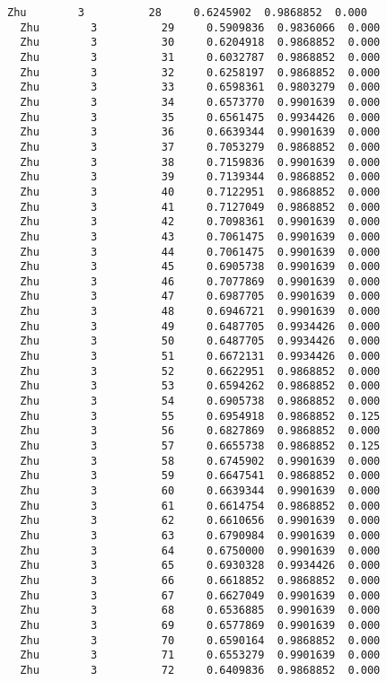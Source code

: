 \documentclass[11pt]{article}
\begin{document}
\begin{Verbatim}[commandchars=\\\{\}]
  Zhu        3          28     0.6245902  0.9868852  0.000
  Zhu        3          29     0.5909836  0.9836066  0.000
  Zhu        3          30     0.6204918  0.9868852  0.000
  Zhu        3          31     0.6032787  0.9868852  0.000
  Zhu        3          32     0.6258197  0.9868852  0.000
  Zhu        3          33     0.6598361  0.9803279  0.000
  Zhu        3          34     0.6573770  0.9901639  0.000
  Zhu        3          35     0.6561475  0.9934426  0.000
  Zhu        3          36     0.6639344  0.9901639  0.000
  Zhu        3          37     0.7053279  0.9868852  0.000
  Zhu        3          38     0.7159836  0.9901639  0.000
  Zhu        3          39     0.7139344  0.9868852  0.000
  Zhu        3          40     0.7122951  0.9868852  0.000
  Zhu        3          41     0.7127049  0.9868852  0.000
  Zhu        3          42     0.7098361  0.9901639  0.000
  Zhu        3          43     0.7061475  0.9901639  0.000
  Zhu        3          44     0.7061475  0.9901639  0.000
  Zhu        3          45     0.6905738  0.9901639  0.000
  Zhu        3          46     0.7077869  0.9901639  0.000
  Zhu        3          47     0.6987705  0.9901639  0.000
  Zhu        3          48     0.6946721  0.9901639  0.000
  Zhu        3          49     0.6487705  0.9934426  0.000
  Zhu        3          50     0.6487705  0.9934426  0.000
  Zhu        3          51     0.6672131  0.9934426  0.000
  Zhu        3          52     0.6622951  0.9868852  0.000
  Zhu        3          53     0.6594262  0.9868852  0.000
  Zhu        3          54     0.6905738  0.9868852  0.000
  Zhu        3          55     0.6954918  0.9868852  0.125
  Zhu        3          56     0.6827869  0.9868852  0.000
  Zhu        3          57     0.6655738  0.9868852  0.125
  Zhu        3          58     0.6745902  0.9901639  0.000
  Zhu        3          59     0.6647541  0.9868852  0.000
  Zhu        3          60     0.6639344  0.9901639  0.000
  Zhu        3          61     0.6614754  0.9868852  0.000
  Zhu        3          62     0.6610656  0.9901639  0.000
  Zhu        3          63     0.6790984  0.9901639  0.000
  Zhu        3          64     0.6750000  0.9901639  0.000
  Zhu        3          65     0.6930328  0.9934426  0.000
  Zhu        3          66     0.6618852  0.9868852  0.000
  Zhu        3          67     0.6627049  0.9901639  0.000
  Zhu        3          68     0.6536885  0.9901639  0.000
  Zhu        3          69     0.6577869  0.9901639  0.000
  Zhu        3          70     0.6590164  0.9868852  0.000
  Zhu        3          71     0.6553279  0.9901639  0.000
  Zhu        3          72     0.6409836  0.9868852  0.000

\end{Verbatim}
\end{document}
